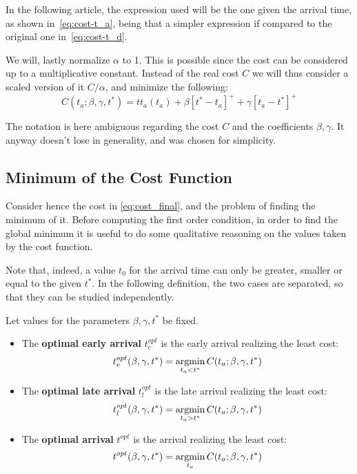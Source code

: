 In the following article,
the expression used will be the one given the arrival time, as shown in~\eqref{eq:cost-t_a},
being that a simpler expression if compared to the original one in~\eqref{eq:cost-t_d}.

We will, lastly normalize \(\alpha\) to 1.
This is possible since the cost can be considered up to a multiplicative constant.
Instead of the real cost \(C\) we will thus consider a scaled version of it \(C/\alpha\),
and minimize the following:
\begin{equation}
  \label{eq:cost_final}
  C(t_a; \beta, \gamma, t^*) = tt_a(t_a) + \beta[t^*- t_a]^+ + \gamma[t_a - t^*]^+ 
\end{equation}

The notation is here ambiguous regarding the cost \(C\) and the coefficients \(\beta,\gamma\).
It anyway doesn't lose in generality, and was chosen for simplicity.

\subsection{Minimum of the Cost Function}
\label{sec:cost_minima}



Consider hence the cost in \eqref{eq:cost_final},
and the problem of finding the minimum of it.
Before computing the first order condition,
in order to find the global minimum it is useful to do some qualitative reasoning on the values taken by the cost function.

Note that, indeed, a value \(t_0\) for the arrival time can only be greater,
smaller or equal to the given \(t^*\).
In the following definition,
the two cases are separated, so that they can be studied independently.
\begin{definition}
  Let values for the parameters \(\beta, \gamma, t^*\) be fixed.
  \begin{itemize}
  \item The \textbf{optimal early arrival} \(t_e^{opt}\) is the early arrival realizing the least cost:
    \begin{equation*}
      t_e^{opt}(\beta, \gamma ,t^*) = \operatorname*{argmin}_{t_a < t^*}C(t_a; \beta, \gamma, t^*)
    \end{equation*}
  \item The \textbf{optimal late arrival} \(t_l^{opt}\) is the late arrival realizing the least cost:
    \begin{equation*}
      t_l^{opt}(\beta, \gamma ,t^*) = \operatorname*{argmin}_{t_a > t^*}C(t_a; \beta, \gamma, t^*)
    \end{equation*}
  \item The \textbf{optimal arrival} \(t^{opt}\) is the arrival realizing the least cost:
    \begin{equation*}
      t^{opt}(\beta, \gamma ,t^*) = \operatorname*{argmin}_{t_a}C(t_a; \beta, \gamma, t^*)
    \end{equation*}
  \end{itemize}
\end{definition}

